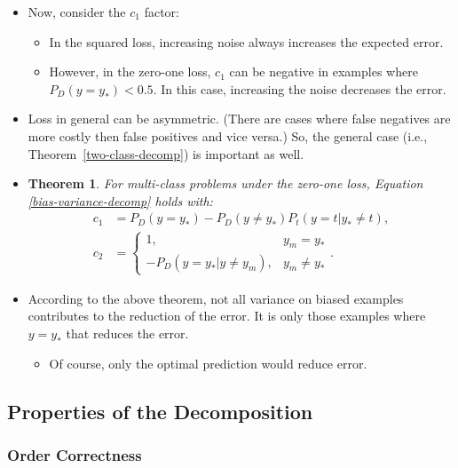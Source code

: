 \documentclass[10pt]{article}
\newtheorem{theorem}[lemma]{Theorem}
\begin{document}
\begin{itemize}
    \item Now, consider the $c_1$ factor:
    \begin{itemize}
      \item In the squared loss, increasing noise always increases the expected error.
      \item However, in the zero-one loss, $c_1$ can be negative in examples where $P_D(y = y_*) < 0.5$. In this case, increasing the noise decreases the error.
    \end{itemize}

    \item Loss in general can be asymmetric. (There are cases where false negatives are more costly then false positives and vice versa.) So, the general case (i.e., Theorem~\ref{two-class-decomp}) is important as well.

    \item \begin{theorem}
      For multi-class problems under the zero-one loss, Equation \eqref{bias-variance-decomp} holds with:
      \begin{align*}
        c_1 &= P_D(y = y_*) - P_D(y \neq y_*) P_t(y = t | y_* \neq t), \\
        c_2 &= \begin{cases}
          1, & y_m = y_* \\
          -P_D(y=y_* | y \neq y_m), & y_m \neq y_*
        \end{cases}.
      \end{align*}
    \end{theorem}

    \item According to the above theorem, not all variance on biased examples contributes to the reduction of the error. It is only those examples where $y = y_*$ that reduces the error.
    \begin{itemize}
      \item Of course, only the optimal prediction would reduce error.
    \end{itemize}
  \end{itemize}

  \subsection{Properties of the Decomposition}

  \subsubsection{Order Correctness}
\end{document}
